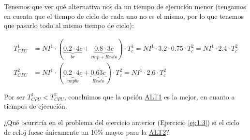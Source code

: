 \begin{ejercicio}
    Tenemos que ver qué alternativa nos da un tiempo de ejecución menor (tengamos en cuenta que el tiempo de ciclo de cada uno no es el mismo, por lo que tenemos que pasarlo todo al mismo tiempo de ciclo):

    \begin{align*}
        T_{CPU}^1 &= NI^1 \cdot (\underbrace{0.2 \cdot 4c}_{br} + \underbrace{0.8 \cdot 3c}_{cmp+Resto}) \cdot T_c^1 = NI^1 \cdot 3.2 \cdot 0.75 \cdot T_c^2 = NI^1 \cdot 2.4 \cdot T_c^2\\
        T_{CPU}^2 &= NI^1 \cdot (\underbrace{0.2 \cdot 4c}_{cmpbr} + \underbrace{0.6\dot 3c}_{Resto}) \cdot T_c^2 = NI^1 \cdot 2.6 \cdot T_c^2
    \end{align*}

    Por ser $T_{CPU}^1 < T_{CPU}^2$, concluimos que la opción \ul{ALT1} es la mejor, en cuanto a tiempos de ejecución.
\end{ejercicio}

\begin{ejercicio}
    ¿Qué ocurriría en el problema del ejercicio anterior (Ejercicio \ref{ej:1.3}) si el ciclo de reloj fuese únicamente un 10\% mayor para
    la \ul{ALT2}?
\end{ejercicio}

